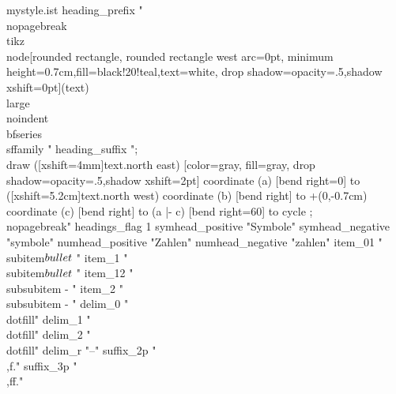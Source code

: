 \begin{filecontents}[overwrite]{mystyle.ist}
heading_prefix "
\\nopagebreak\n
\\tikz{%
\\node[rounded rectangle, rounded rectangle west arc=0pt, minimum height=0.7cm,fill=black!20!teal,text=white, drop shadow={opacity=.5,shadow xshift=0pt}](text){\\large\\noindent\\bfseries\\sffamily " %
heading_suffix "};
\\draw ([xshift=4mm]text.north east) [color=gray, fill=gray, drop shadow={opacity=.5,shadow xshift=2pt}] coordinate (a) [bend right=0] to ([xshift=5.2cm]text.north west) coordinate (b) [bend right] to +(0,-0.7cm) coordinate (c) [bend right] to (a |- c) [bend right=60] to cycle ;
}
\\nopagebreak\n"
headings_flag  1 %
symhead_positive "Symbole"
symhead_negative "symbole"
numhead_positive "Zahlen"
numhead_negative "zahlen"
item_01 "\n \\subitem$\\bullet$ "
item_1 "\n \\subitem$\\bullet$ "
item_12 "\n \\subsubitem - "
item_2 "\n \\subsubitem - "
delim_0 "\\dotfill" %
delim_1 "\\dotfill" %
delim_2 "\\dotfill" %
delim_r "--" %
suffix_2p "\\,f." %
suffix_3p "\\,ff." %
\end{filecontents}
\makeatletter
\def\@idxitem{\par\hangindent 0pt}
\makeatother

\ifthenelse{\isundefined{\hypersetup}}{}{
    \hypersetup{
    }
}


